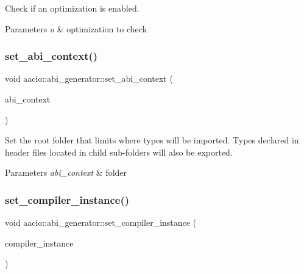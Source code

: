 Check if an optimization is enabled. 


\begin{DoxyParams}{Parameters}
{\em o} & optimization to check \\
\hline
\end{DoxyParams}
\mbox{\label{classaacio_1_1abi__generator_a9a1345c18ec1a52dc188383e929e3a80}} 
\subsubsection{\texorpdfstring{set\+\_\+abi\+\_\+context()}{set\_abi\_context()}}
{\footnotesize\ttfamily void aacio\+::abi\+\_\+generator\+::set\+\_\+abi\+\_\+context (\begin{DoxyParamCaption}\item[{const string \&}]{abi\+\_\+context }\end{DoxyParamCaption})}



Set the root folder that limits where types will be imported. Types declared in header files located in child sub-\/folders will also be exported. 


\begin{DoxyParams}{Parameters}
{\em abi\+\_\+context} & folder \\
\hline
\end{DoxyParams}
\mbox{\label{classaacio_1_1abi__generator_a0c33878a4bc413470c67aaa68a970bee}} 
\subsubsection{\texorpdfstring{set\+\_\+compiler\+\_\+instance()}{set\_compiler\_instance()}}
{\footnotesize\ttfamily void aacio\+::abi\+\_\+generator\+::set\+\_\+compiler\+\_\+instance (\begin{DoxyParamCaption}\item[{Compiler\+Instance \&}]{compiler\+\_\+instance }\end{DoxyParamCaption})}



